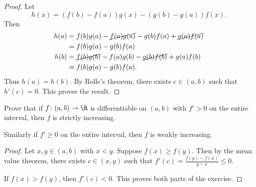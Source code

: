 \begin{proof}
    Let \[
        h(x) = (f(b) - f(a))g(x) - (g(b) - g(a))f(x).
    \] Then \begin{align*}
        h(a) &= f(b) g(a) - \cancel{f(a) g(a)}
                - g(b) f(a) + \cancel{g(a) f(a)} \\
             &= f(b) g(a) - g(b) f(a) \\
        h(b) &= \cancel{f(b) g(b)} - f(a) g(b)
                - \cancel{g(b) f(b)} + g(a) f(b) \\
             &= f(b) g(a) - g(b) f(a).
    \end{align*}
    Thus $h(a) = h(b)$.
    By Rolle's theorem, there exists $c \in (a, b)$ such that $h'(c) = 0$.
    This proves the result.
\end{proof}

\begin{exercise}
    Prove that if $f\colon (a, b) \to \R$ is differentiable on $(a, b)$
    with $f' > 0$ on the entire interval, then $f$ is strictly increasing.

    Similarly if $f' \ge 0$ on the entire interval, then $f$ is
    weakly increasing.
\end{exercise}
\begin{proof}
    Let $x, y \in (a, b)$ with $x < y$.
    Suppose $f(x) \ge f(y)$.
    Then by the mean value theorem, there exists $c \in (x, y)$ such that
    $f'(c) = \frac{f(y) - f(x)}{y - x} \le 0$.

    If $f(x) > f(y)$, then $f'(c) < 0$.
    This proves both parts of the exercise.
\end{proof}

